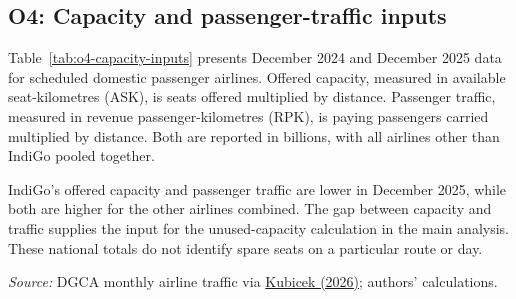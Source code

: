 \documentclass[12pt,a4paper]{article}
\begin{document}
\clearpage
\subsection{O4: Capacity and passenger-traffic inputs}
Table~\ref{tab:o4-capacity-inputs} presents December 2024 and December 2025 data for scheduled domestic passenger airlines. Offered capacity, measured in available seat-kilometres (ASK), is seats offered multiplied by distance. Passenger traffic, measured in revenue passenger-kilometres (RPK), is paying passengers carried multiplied by distance. Both are reported in billions, with all airlines other than IndiGo pooled together.

IndiGo's offered capacity and passenger traffic are lower in December 2025, while both are higher for the other airlines combined. The gap between capacity and traffic supplies the input for the unused-capacity calculation in the main analysis. These national totals do not identify spare seats on a particular route or day.

\begin{minipage}{\linewidth}
\captionsetup{font=small,labelfont=bf,justification=raggedright,singlelinecheck=false,hypcap=false}
\label{tab:o4-capacity-inputs}
\centering
{\small{}\par}
\vspace{4pt}
{\footnotesize{}\raggedright\textit{Source:} DGCA monthly airline traffic via \href{https://github.com/mkubicek/india-aviation-stats/tree/16770ac59dae61ce7b80fd8bd67dd7f4cef280a6}{Kubicek (2026)}; authors' calculations.\par}
\end{minipage}


\clearpage
\end{document}
